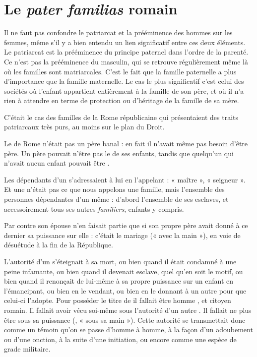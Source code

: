 \section{Le \emph{pater familias} romain}

Il ne faut pas confondre le patriarcat et la prééminence des hommes
sur les femmes, même s'il y a bien entendu un lien significatif entre
ces deux éléments. Le patriarcat est la prééminence du principe paternel
dans l'ordre de la parenté. Ce n'est pas la prééminence du masculin, qui
se retrouve régulièrement même là où les familles sont matriarcales. C'est
le fait que la famille paternelle a plus d'importance que la famille maternelle.
Le cas le plus significatif c'est celui des sociétés où l'enfant appartient
entièrement à la famille de son père, et où il n'a rien à attendre en
terme de protection ou d'héritage de la famille de sa mère.

C'était le cas des familles de la Rome républicaine qui présentaient
des traits patriarcaux très purs, au moins sur le plan du Droit.

Le  de Rome n'était pas un père banal : en fait il n'avait
même pas besoin d'être père. Un père pouvait n'être pas le 
de ses enfants, tandis que quelqu'un qui n'avait aucun enfant pouvait être
.

Les dépendants d'un  s'adressaient à lui en l'appelant
 : « maître », « seigneur ». Et une  n'était pas ce que nous
appelons une famille, mais l'ensemble des personnes dépendantes d'un même
 : d'abord l'ensemble de ses esclaves, et accessoirement tous ses
autres \emph{familiers}, enfants y compris.

Par contre son épouse n'en faisait partie que si son propre père
avait donné à ce dernier sa puissance sur elle : c'était le mariage 
(« avec la main »), en voie de désuétude à la fin de la République.

L'autorité d'un  s'éteignait à sa mort, ou bien quand il
était condamné à une peine infamante, ou bien quand il devenait esclave,
quel qu'en soit le motif, ou bien quand il renonçait de lui-même à sa
propre puissance sur un enfant en l'émancipant, ou bien en le vendant,
ou bien en le donnant à un autre  pour que celui-ci l'adopte.
Pour posséder le titre de  il fallait être homme , et citoyen
romain. Il fallait avoir vécu soi-même sous l'autorité d'un autre .
Il fallait ne plus être sous sa puissance (, « sous sa main »).
Cette autorité se transmettait donc comme un témoin qu'on se passe
d'homme à homme, à la façon d'un adoubement ou d'une onction, à la
suite d'une initiation, ou encore comme une espèce de grade militaire.

